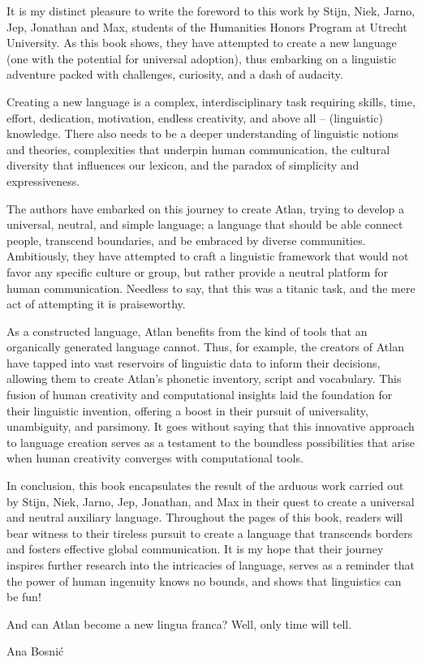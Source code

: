 \pagebreak


\noindent It is my distinct pleasure to write the foreword to this work by Stijn, Niek, Jarno, Jep, Jonathan and Max, students of the Humanities Honors Program at Utrecht University. As this book shows, they have attempted to create a new language (one with the potential for universal adoption), thus embarking on a linguistic adventure packed with challenges, curiosity, and a dash of audacity.  

Creating a new language is a complex, interdisciplinary task requiring skills, time, effort, dedication, motivation, endless creativity, and above all – (linguistic) knowledge. There also needs to be a deeper understanding of linguistic notions and theories, complexities that underpin human communication, the cultural diversity that influences our lexicon, and the paradox of simplicity and expressiveness.  

The authors have embarked on this journey to create Atlan, trying to develop a universal, neutral, and simple language; a language that should be able connect people, transcend boundaries, and be embraced by diverse communities. Ambitiously, they have attempted to craft a linguistic framework that would not favor any specific culture or group, but rather provide a neutral platform for human communication. Needless to say, that this was a titanic task, and the mere act of attempting it is praiseworthy.  

 As a constructed language, Atlan benefits from the kind of tools that an organically generated language cannot. Thus, for example, the creators of Atlan have tapped into vast reservoirs of linguistic data to inform their decisions, allowing them to create Atlan’s phonetic inventory, script and vocabulary. This fusion of human creativity and computational insights laid the foundation for their linguistic invention, offering a boost in their pursuit of universality, unambiguity, and parsimony. It goes without saying that this innovative approach to language creation serves as a testament to the boundless possibilities that arise when human creativity converges with computational tools.  

In conclusion, this book encapsulates the result of the arduous work carried out by Stijn, Niek, Jarno, Jep, Jonathan, and Max in their quest to create a universal and neutral auxiliary language. Throughout the pages of this book, readers will bear witness to their tireless pursuit to create a language that transcends borders and fosters effective global communication. It is my hope that their journey inspires further research into the intricacies of language, serves as a reminder that the power of human ingenuity knows no bounds, and shows that linguistics can be fun!  

And can Atlan become a new lingua franca? Well, only time will tell. 



\hfill Ana Bosni\'{c}
